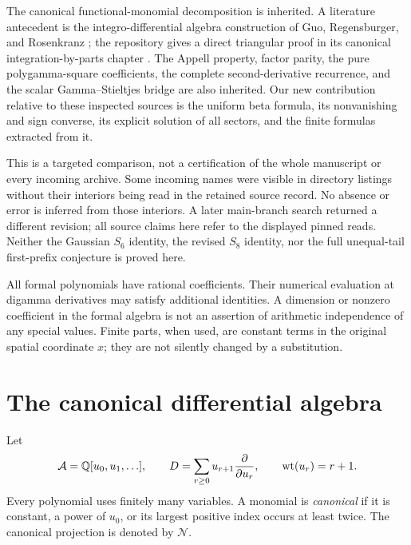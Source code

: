 \documentclass[11pt]{article}
\numberwithin{equation}{section}
\theoremstyle{definition}\newtheorem{definition}[theorem]{Definition}
\theoremstyle{remark}\newtheorem{remark}[theorem]{Remark}
\newcommand{\Q}{\mathbb Q}\newcommand{\C}{\mathbb C}\newcommand{\Ncal}{\mathcal N}\newcommand{\Acal}{\mathcal A}\newcommand{\dd}{\,\mathrm d}
\begin{document}
The canonical functional-monomial decomposition is inherited. A literature antecedent is the integro-differential algebra construction of Guo, Regensburger, and Rosenkranz \cite{guo}; the repository gives a direct triangular proof in its canonical integration-by-parts chapter \cite{ibp}. The Appell property, factor parity, the pure polygamma-square coefficients, the complete second-derivative recurrence, and the scalar Gamma--Stieltjes bridge are also inherited. Our new contribution relative to these inspected sources is the uniform beta formula, its nonvanishing and sign converse, its explicit solution of all sectors, and the finite formulas extracted from it.

This is a targeted comparison, not a certification of the whole manuscript or every incoming archive. Some incoming names were visible in directory listings without their interiors being read in the retained source record. No absence or error is inferred from those interiors. A later main-branch search returned a different revision; all source claims here refer to the displayed pinned reads. Neither the Gaussian $S_6$ identity, the revised $S_8$ identity, nor the full unequal-tail first-prefix conjecture is proved here.

All formal polynomials have rational coefficients. Their numerical evaluation at digamma derivatives may satisfy additional identities. A dimension or nonzero coefficient in the formal algebra is not an assertion of arithmetic independence of any special values. Finite parts, when used, are constant terms in the original spatial coordinate $x$; they are not silently changed by a substitution.

\section{The canonical differential algebra}
Let
\[
 \Acal=\Q[u_0,u_1,\ldots],\qquad
 D=\sum_{r\ge0}u_{r+1}\frac{\partial}{\partial u_r},
 \qquad \wt(u_r)=r+1.
\]
Every polynomial uses finitely many variables. A monomial is \emph{canonical} if it is constant, a power of $u_0$, or its largest positive index occurs at least twice. The canonical projection is denoted by $\Ncal$.
\end{document}
